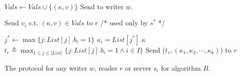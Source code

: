 \begin{algorithm*}[!ht]
\begin{algorithmic}[2]
\vspace{-1.7em}
\\\hrulefill
\vspace{-1.5em}
      \begin{multicols}{3}{\footnotesize
            \EndPart
            \Statex
             {
                       \State   $Vals \gets   Vals \cup \{({\kappa}, v)\}$ 
              \State  Send {\ackTag} to writer $w$.
            }\EndPart
            \Statex
            \EndPart
                   
                        \Statex
             {
              \State   Send $v_i$ s.t. $({\kappa}, v) \in Vals$  to  $r$
            }\EndPart 
          \Statex\Statex   /* used only by $s^*$ */
          
           {
                     \State $j^* \leftarrow \max \{ j : List[j].b_i =1 \}$
                     \State ${\kappa}_i = List[j^*].{\kappa}$
           \EndFor 
             \State  $t_r \triangleq \max_{1 \leq j \leq |List|} \{ j : List[j].b_i = 1 \wedge i \in I\}$ 
            \State  Send  ($t_r, ({\kappa}_1,{\kappa}_2, \cdots, {\kappa}_k)$) to $r$
            }\EndPart       
          }\end{multicols}
        \end{algorithmic} 
        \caption{The protocol for any  writer $w$, reader $r$ or server $s_i$ for  algorithm $B$.}\label{fig:algo_b}
      \end{algorithm*}


